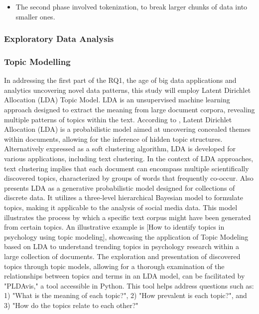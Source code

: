 \begin{itemize}
    \item The second phase involved tokenization, to break larger chunks of data into smaller ones.
\end{itemize}

\subsubsection{Exploratory Data Analysis}


\subsubsection{Topic Modelling}

In addressing the first part of the RQ1, the age of big data applications and analytics uncovering novel data patterns, this study will employ Latent Dirichlet Allocation (LDA) Topic Model. LDA is an unsupervised machine learning approach designed to extract the meaning from large document corpora, revealing multiple patterns of topics within the text.  According to \cite{blei2011introduction}, Latent Dirichlet Allocation (LDA) is a probabilistic model aimed at uncovering concealed themes within documents, allowing for the inference of hidden topic structures. Alternatively expressed as a soft clustering algorithm, LDA is developed for various applications, including text clustering. In the context of LDA approaches, text clustering implies that each document can encompass multiple scientifically discovered topics, characterized by groups of words that frequently co-occur.
Also \cite{blei2003latent} presents LDA as a generative probabilistic model designed for collections of discrete data. It utilizes a three-level hierarchical Bayesian model to formulate topics, making it applicable to the analysis of social media data. This model illustrates the process by which a specific text corpus might have been generated from certain topics. An illustrative example is [How to identify topics in psychology using topic modeling], showcasing the application of Topic Modeling based on LDA to understand trending topics in psychology research within a large collection of documents.
\cite{mabey2018pyldavis}The exploration and presentation of discovered topics through topic models, allowing for a thorough examination of the relationships between topics and terms in an LDA model, can be facilitated by "PLDAvis," a tool accessible in Python. This tool helps address questions such as: 1) "What is the meaning of each topic?", 2) "How prevalent is each topic?", and 3) "How do the topics relate to each other?"

